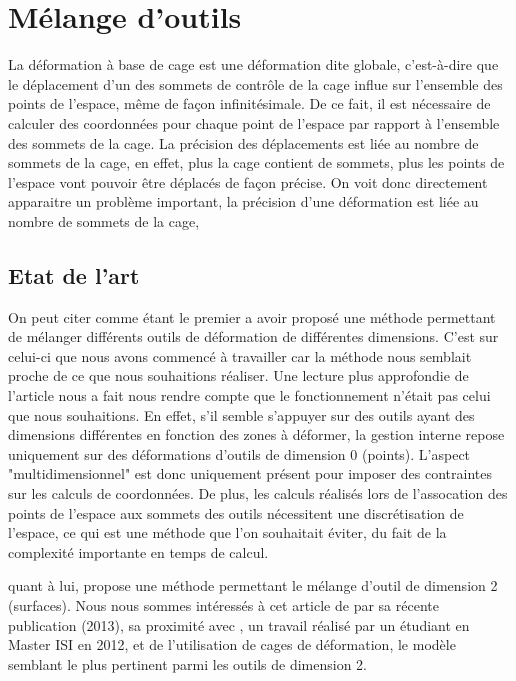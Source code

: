 
\chapter{Mélange d'outils}

\graphicspath{{Chapter2/Chapter2Figs/PNG/}{Chapter2/Chapter2Figs/PDF/}{Chapter2/Chapter2Figs/}}

La déformation à base de cage est une déformation dite globale,
c'est-à-dire que le déplacement d'un des sommets de contrôle de la
cage influe sur l'ensemble des points de l'espace, même de façon
infinitésimale. De ce fait, il est nécessaire de calculer des
coordonnées pour chaque point de l'espace par rapport à l'ensemble des
sommets de la cage. La précision des déplacements est liée au nombre
de sommets de la cage, en effet, plus la cage contient de sommets,
plus les points de l'espace vont pouvoir être déplacés de façon
précise. On voit donc directement apparaitre un problème important, la
précision d'une déformation est liée au nombre de sommets de la cage,

\section{Etat de l'art}
On peut citer \cite{JBPS11} comme étant le premier a avoir proposé une
méthode permettant de mélanger différents outils de déformation de
différentes dimensions.  C'est sur celui-ci que nous avons commencé à
travailler car la méthode nous semblait proche de ce que nous
souhaitions réaliser. Une lecture plus approfondie de l'article nous a
fait nous rendre compte que le fonctionnement n'était pas celui que
nous souhaitions.  En effet, s'il semble s'appuyer sur des outils
ayant des dimensions différentes en fonction des zones à déformer, la
gestion interne repose uniquement sur des déformations d'outils de
dimension 0 (points).  L'aspect "multidimensionnel" est donc
uniquement présent pour imposer des contraintes sur les calculs de
coordonnées. De plus, les calculs réalisés lors de l'assocation des
points de l'espace aux sommets des outils nécessitent une
discrétisation de l'espace, ce qui est une méthode que l'on souhaitait
éviter, du fait de la complexité importante en temps de calcul.

\cite{GPCP13} quant à lui, propose une méthode permettant le mélange
d'outil de dimension 2 (surfaces). Nous nous sommes intéressés à cet
article de par sa récente publication (2013), sa proximité avec
\cite{Hur12}, un travail réalisé par un étudiant en Master ISI en
2012, et de l'utilisation de cages de déformation, le modèle semblant
le plus pertinent parmi les outils de dimension 2.


